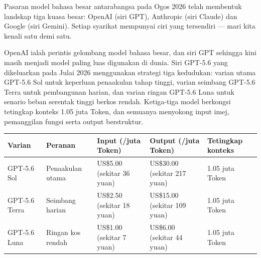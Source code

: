 


Pasaran model bahasa besar antarabangsa pada Ogos 2026 telah membentuk landskap tiga kuasa besar: OpenAI (siri GPT), Anthropic (siri Claude) dan Google (siri Gemini). Setiap syarikat mempunyai ciri yang tersendiri — mari kita kenali satu demi satu.


OpenAI ialah perintis gelombang model bahasa besar, dan siri GPT sehingga kini masih menjadi model paling luas digunakan di dunia. Siri GPT-5.6 yang dikeluarkan pada Julai 2026 menggunakan strategi tiga kedudukan: varian utama GPT-5.6 Sol untuk keperluan penaakulan tahap tinggi, varian seimbang GPT-5.6 Terra untuk pembangunan harian, dan varian ringan GPT-5.6 Luna untuk senario beban serentak tinggi berkos rendah. Ketiga-tiga model berkongsi tetingkap konteks 1.05 juta Token, dan semuanya menyokong input imej, pemanggilan fungsi serta output berstruktur.

\begin{center}
\begin{tabularx}{\linewidth}{|X|X|X|X|X|}
\hline
\textbf{Varian} & \textbf{Peranan} & \textbf{Input (/juta Token)} & \textbf{Output (/juta Token)} & \textbf{Tetingkap konteks} \tabularnewline
\hline
GPT-5.6 Sol & Penaakulan utama & US\$5.00 (sekitar 36 yuan) & US\$30.00 (sekitar 217 yuan) & 1.05 juta Token \tabularnewline
GPT-5.6 Terra & Seimbang harian & US\$2.50 (sekitar 18 yuan) & US\$15.00 (sekitar 109 yuan) & 1.05 juta Token \tabularnewline
GPT-5.6 Luna & Ringan kos rendah & US\$1.00 (sekitar 7 yuan) & US\$6.00 (sekitar 44 yuan) & 1.05 juta Token \tabularnewline
\hline
\end{tabularx}
\end{center}

